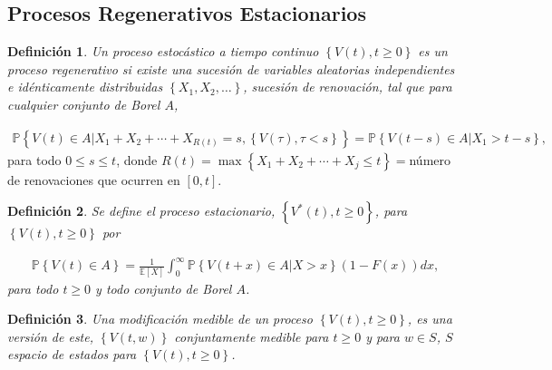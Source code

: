 \documentclass{article}
\newtheorem{Def}{Definición}[section]
\newcommand{\esp}{\mathbb{E}}
\newcommand{\prob}{\mathbb{P}}
\numberwithin{equation}{section}
\begin{document}
\subsection*{Procesos Regenerativos Estacionarios}

\begin{Def}
Un proceso estoc\'astico a tiempo continuo $\left\{V\left(t\right),t\geq0\right\}$ es un proceso regenerativo si existe una sucesi\'on de variables aleatorias independientes e id\'enticamente distribuidas $\left\{X_{1},X_{2},\ldots\right\}$, sucesi\'on de renovaci\'on, tal que para cualquier conjunto de Borel $A$, 
\end{Def}

\begin{eqnarray}
\prob\left\{V\left(t\right)\in A|X_{1}+X_{2}+\cdots+X_{R\left(t\right)}=s,\left\{V\left(\tau\right),\tau<s\right\}\right\}=\prob\left\{V\left(t-s\right)\in A|X_{1}>t-s\right\},
\end{eqnarray}
para todo $0\leq s\leq t$, donde $R\left(t\right)=\max\left\{X_{1}+X_{2}+\cdots+X_{j}\leq t\right\}=$n\'umero de renovaciones que ocurren en $\left[0,t\right]$.


\begin{Def}
Se define el proceso estacionario, $\left\{V^{*}\left(t\right),t\geq0\right\}$, para $\left\{V\left(t\right),t\geq0\right\}$ por

\begin{eqnarray}
\prob\left\{V\left(t\right)\in A\right\}=\frac{1}{\esp\left[X\right]}\int_{0}^{\infty}\prob\left\{V\left(t+x\right)\in A|X>x\right\}\left(1-F\left(x\right)\right)dx,
\end{eqnarray} 
para todo $t\geq0$ y todo conjunto de Borel $A$.
\end{Def}

\begin{Def}
Una modificaci\'on medible de un proceso $\left\{V\left(t\right),t\geq0\right\}$, es una versi\'on de este, $\left\{V\left(t,w\right)\right\}$ conjuntamente medible para $t\geq0$ y para $w\in S$, $S$ espacio de estados para $\left\{V\left(t\right),t\geq0\right\}$.
\end{Def}
\end{document}
